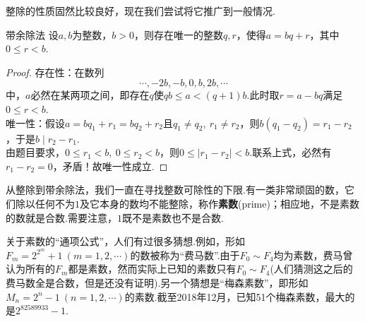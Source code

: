 整除的性质固然比较良好，现在我们尝试将它推广到一般情况.

\begin{theorem}{带余除法}
	设$a,b$为整数，$b>0$，则存在唯一的整数$q,r$，使得$a=bq+r$，其中$0 \leq r <b$.
\end{theorem}
\begin{proof}
	存在性：在数列$$\cdots , -2b ,-b , 0 ,b,2b,\cdots $$中，$a$必然在某两项之间，即存在$q$使$qb \leq a < (q+1)b$.此时取$r=a-bq$满足$0 \leq r <b$. \\
	唯一性：假设$a=bq_1+r_1=bq_2+r_2$且$q_1 \neq q_2,~r_1 \neq r_2$，则$b(q_1-q_2)=r_1-r_2$，于是$b \mid r_2-r_1$. \\
	由题目要求，$0 \leq r_1 < b,~0 \leq r_2 < b$，则$0 \leq |r_1-r_2| < b$.联系上式，必然有$r_1-r_2=0$，矛盾！故唯一性成立.
\end{proof}

从整除到带余除法，我们一直在寻找整数可除性的下限.有一类非常顽固的数，它们除以任何不为$1$及它本身的数均不能整除，称作\textbf{素数}(prime)；相应地，不是素数的数就是合数.需要注意，$1$既不是素数也不是合数.

关于素数的“通项公式”，人们有过很多猜想.例如，形如$F_m=2^{2^m}+1~(m=1,2,\cdots )$的数被称为“费马数”.由于$F_0 \sim F_4$均为素数，费马曾认为所有的$F_m$都是素数，然而实际上已知的素数只有$F_0 \sim F_4$(人们猜测这之后的费马数全是合数，但是还没有证明).另一个猜想是“梅森素数”，即形如$M_n=2^n-1~(n=1,2,\cdots )$的素数.截至2018年12月，已知51个梅森素数，最大的是$2^{82589933}-1$.

